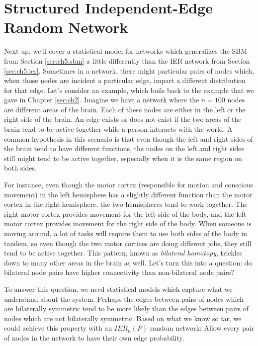\section{Structured Independent-Edge Random Network}
\label{sec:ch5:siem}

Next up, we'll cover a statistical model for networks which generalizes the SBM from Section \ref{sec:ch5:sbm} a little differently than the IER network from Section \ref{sec:ch5:ier}. Sometimes in a network, there might particular pairs of nodes which, when those nodes are incident a particular edge, impart a different distribution for that edge. Let's consider an example, which boils back to the example that we gave in Chapter \ref{sec:ch2}. Imagine we have a network where the $n=100$ nodes are different areas of the brain.  Each of these nodes are either in the left or the right side of the brain. An edge exists or does not exist if the two areas of the brain tend to be active together while a person interacts with the world. A common hypothesis in this scenario is that even though the left and right sides of the brain tend to have different functions, the nodes on the left and right sides still might tend to be active together, especially when it is the same region on both sides. 

For instance, even though the motor cortex (responsible for {motion} and {conscious movement}) in the left hemisphere has a slightly different function than the motor cortex in the right hemisphere, the two hemispheres tend to work together. The right motor cortex provides movement for the left side of the body, and the left motor cortex provides movement for the right side of the body. When someone is moving around, a lot of tasks will require them to use both sides of the body in tandem, so even though the two motor cortices are doing different jobs, they still tend to be active together. This pattern, known as \textit{bilateral homotopy}, trickles down to many other areas in the brain as well. Let's turn this into a question: do bilateral node pairs have higher connectivity than non-bilateral node pairs?

To answer this question, we need statistical models which capture what we understand about the system. Perhaps the edges between pairs of nodes which are bilaterally symmetric tend to be more likely than the edges between pairs of nodes which are not bilaterally symmetric. Based on what we know so far, we could achieve this property with an $IER_n(P)$ random network: Allow every pair of nodes in the network to have their own edge probability.

